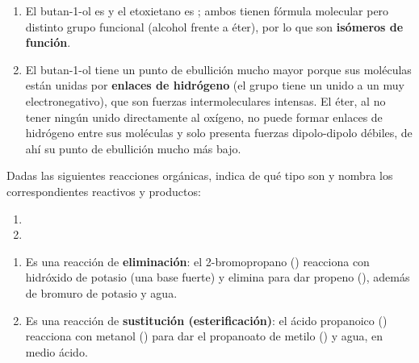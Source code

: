 \begin{exerciseEVAU}
\begin{solu}
        \begin{enumerate}[label=\letraminuscula]
            \item El butan-1-ol es  y el etoxietano es ; ambos tienen fórmula molecular  pero distinto grupo funcional (alcohol frente a éter), por lo que son \textbf{isómeros de función}.

            \item El butan-1-ol tiene un punto de ebullición mucho mayor porque sus moléculas están unidas por \textbf{enlaces de hidrógeno} (el grupo  tiene un  unido a un  muy electronegativo), que son fuerzas intermoleculares intensas. El éter, al no tener ningún  unido directamente al oxígeno, no puede formar enlaces de hidrógeno entre sus moléculas y solo presenta fuerzas dipolo-dipolo débiles, de ahí su punto de ebullición mucho más bajo.
        \end{enumerate}
    \end{solu}
\end{exerciseEVAU}

\begin{exerciseEVAU}
    Dadas las siguientes reacciones orgánicas, indica de qué tipo son y nombra los correspondientes reactivos y productos:

    \begin{enumerate}[label=\letraminuscula]
        \item {}
        \item {}
    \end{enumerate}

    \begin{solu}


        \begin{enumerate}[label=\letraminuscula]
            \item Es una reacción de \textbf{eliminación}: el 2-bromopropano () reacciona con hidróxido de potasio (una base fuerte) y elimina  para dar propeno (), además de bromuro de potasio y agua.

            \item Es una reacción de \textbf{sustitución (esterificación)}: el ácido propanoico () reacciona con metanol () para dar el propanoato de metilo () y agua, en medio ácido.
        \end{enumerate}
    \end{solu}
\end{exerciseEVAU}

